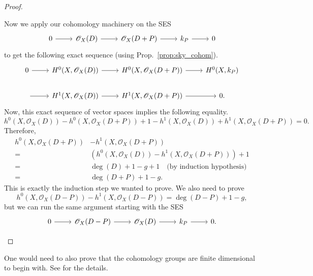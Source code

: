 \begin{proof}
\begin{description}[style=nextline]
          Now we apply our cohomology machinery on the SES
          \[
          \begin{tikzcd}
            0\arrow{r} & \mathscr{O}_X(D)\arrow{r} & \mathscr{O}_X(D+P)\arrow{r}
            & k_{P}\arrow{r} & 0
          \end{tikzcd}
          \]
          to get the following exact sequence (using
          Prop.~\ref{prop:sky_cohom}).
          \[
          \begin{tikzcd}
            0\arrow{r} & H^{0}(X, \mathscr{O}_X(D))\arrow{r}
            & H^{0}(X, \mathscr{O}_X(D+P))\arrow{r}
            & H^{0}(X, k_{P}) \\
            \arrow{r} & H^{1}(X, \mathscr{O}_X(D))\arrow{r}
            & H^{1}(X, \mathscr{O}_X(D+P))\arrow{r} & 0.
          \end{tikzcd}
          \]
          Now, this exact sequence of vector spaces implies the following
          equality.
          \[
          h^{0}(X,\mathscr{O}_X(D))-h^{0}(X, \mathscr{O}_X(D+P))
          +1-h^{1}(X,\mathscr{O}_X(D))+h^{1}(X,\mathscr{O}_X(D+P)) = 0.
          \]
          Therefore,
          \begin{align*}
            h^{0}(X,\mathscr{O}_X(D+P))&-h^{1}(X,\mathscr{O}_X(D+P)) \\
            =&\left(h^{0}(X,\mathscr{O}_X(D))-h^{1}(X,\mathscr{O}_X(D+P))\right)
              +1 \\
            =&\deg(D)+1-g+1\quad\text{(by induction hypothesis)} \\
            =&\deg(D+P)+1-g.
          \end{align*}
          This is exactly the induction step we wanted to prove.
          We also need to prove
          \[
            h^{0}(X,\mathscr{O}_X(D-P))-h^{1}(X,\mathscr{O}_X(D-P))
            =\deg(D-P)+1-g,
          \]
          but we can run the same argument starting with the SES
          \[
          \begin{tikzcd}
            0\arrow{r} & \mathscr{O}_X(D-P)\arrow{r} & \mathscr{O}_X(D)\arrow{r}
            & k_{P}\arrow{r} & 0.
          \end{tikzcd}
          \]
  \end{description}
\end{proof}
\begin{lwarn}
  One would need to also prove that the cohomology groups are finite
  dimensional to begin with. See \cite{serre} for the details.
\end{lwarn}

